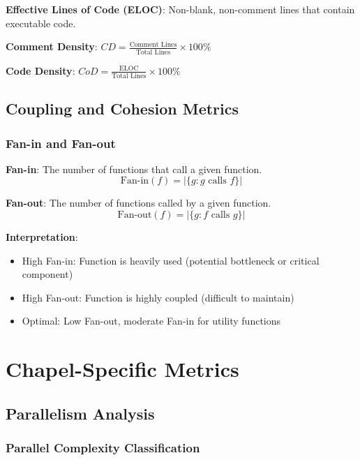 \documentclass[11pt,a4paper]{article}
\begin{document}
\textbf{Effective Lines of Code (ELOC)}: Non-blank, non-comment lines that contain executable code.

\textbf{Comment Density}: $CD = \frac{\text{Comment Lines}}{\text{Total Lines}} \times 100\%$

\textbf{Code Density}: $CoD = \frac{\text{ELOC}}{\text{Total Lines}} \times 100\%$

\subsection{Coupling and Cohesion Metrics}

\subsubsection{Fan-in and Fan-out}

\textbf{Fan-in}: The number of functions that call a given function.
\begin{equation}
\text{Fan-in}(f) = |\{g : g \text{ calls } f\}|
\end{equation}

\textbf{Fan-out}: The number of functions called by a given function.
\begin{equation}
\text{Fan-out}(f) = |\{g : f \text{ calls } g\}|
\end{equation}

\textbf{Interpretation}:
\begin{itemize}
    \item High Fan-in: Function is heavily used (potential bottleneck or critical component)
    \item High Fan-out: Function is highly coupled (difficult to maintain)
    \item Optimal: Low Fan-out, moderate Fan-in for utility functions
\end{itemize}

\section{Chapel-Specific Metrics}

\subsection{Parallelism Analysis}

\subsubsection{Parallel Complexity Classification}
\end{document}
